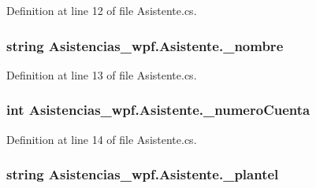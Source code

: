 Definition at line 12 of file Asistente.\-cs.

\hypertarget{class_asistencias__wpf_1_1_asistente_a0550570e3668c5b155fda7b5ca5a4484}{
\subsubsection[{\-\_\-nombre}]{\setlength{\rightskip}{0pt plus 5cm}string Asistencias\-\_\-wpf.\-Asistente.\-\_\-nombre\hspace{0.3cm}{\ttfamily [private]}}}\label{class_asistencias__wpf_1_1_asistente_a0550570e3668c5b155fda7b5ca5a4484}


Definition at line 13 of file Asistente.\-cs.

\hypertarget{class_asistencias__wpf_1_1_asistente_a7575bb2865cc410870a063630527e992}{
\subsubsection[{\-\_\-numero\-Cuenta}]{\setlength{\rightskip}{0pt plus 5cm}int Asistencias\-\_\-wpf.\-Asistente.\-\_\-numero\-Cuenta\hspace{0.3cm}{\ttfamily [private]}}}\label{class_asistencias__wpf_1_1_asistente_a7575bb2865cc410870a063630527e992}


Definition at line 14 of file Asistente.\-cs.

\hypertarget{class_asistencias__wpf_1_1_asistente_a8b6ed5864317a033ade72dfa8b9dc0f9}{
\subsubsection[{\-\_\-plantel}]{\setlength{\rightskip}{0pt plus 5cm}string Asistencias\-\_\-wpf.\-Asistente.\-\_\-plantel\hspace{0.3cm}{\ttfamily [private]}}}\label{class_asistencias__wpf_1_1_asistente_a8b6ed5864317a033ade72dfa8b9dc0f9}


